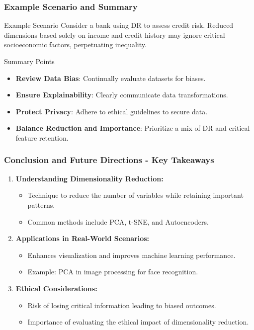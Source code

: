 \documentclass[aspectratio=169]{beamer}
\begin{document}
\begin{frame}[fragile]
  \frametitle{Example Scenario and Summary}
  \begin{block}{Example Scenario}
    Consider a bank using DR to assess credit risk. Reduced dimensions based solely on income and credit history may ignore critical socioeconomic factors, perpetuating inequality.
  \end{block}

  \begin{block}{Summary Points}
    \begin{itemize}
      \item \textbf{Review Data Bias}: Continually evaluate datasets for biases.
      \item \textbf{Ensure Explainability}: Clearly communicate data transformations.
      \item \textbf{Protect Privacy}: Adhere to ethical guidelines to secure data.
      \item \textbf{Balance Reduction and Importance}: Prioritize a mix of DR and critical feature retention.
    \end{itemize}
  \end{block}
\end{frame}

\begin{frame}[fragile]
  \frametitle{Conclusion and Future Directions - Key Takeaways}
  \begin{enumerate}
    \item \textbf{Understanding Dimensionality Reduction:} 
    \begin{itemize}
      \item Technique to reduce the number of variables while retaining important patterns.
      \item Common methods include PCA, t-SNE, and Autoencoders.
    \end{itemize}
    
    \item \textbf{Applications in Real-World Scenarios:} 
    \begin{itemize}
      \item Enhances visualization and improves machine learning performance.
      \item Example: PCA in image processing for face recognition.
    \end{itemize}
    
    \item \textbf{Ethical Considerations:} 
    \begin{itemize}
      \item Risk of losing critical information leading to biased outcomes.
      \item Importance of evaluating the ethical impact of dimensionality reduction.
    \end{itemize}
  \end{enumerate}
\end{frame}
\end{document}
